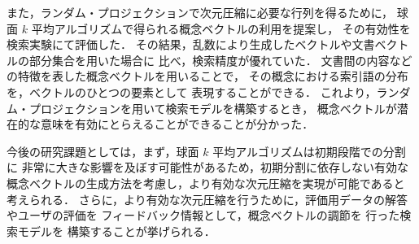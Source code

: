 また，ランダム・プロジェクションで次元圧縮に必要な行列を得るために，
球面 $k$ 平均アルゴリズムで得られる概念ベクトルの利用を提案し，
その有効性を検索実験にて評価した．
その結果，乱数により生成したベクトルや文書ベクトルの部分集合を用いた場合に
比べ，検索精度が優れていた．
文書間の内容などの特徴を表した概念ベクトルを用いることで，
その概念における索引語の分布を，ベクトルのひとつの要素として
表現することができる．
これより，ランダム・プロジェクションを用いて検索モデルを構築するとき，
概念ベクトルが潜在的な意味を有効にとらえることができることが分かった．

今後の研究課題としては，まず，球面 $k$ 平均アルゴリズムは初期段階での分割に
非常に大きな影響を及ぼす可能性があるため，初期分割に依存しない有効な
概念ベクトルの生成方法を考慮し，より有効な次元圧縮を実現が可能であると
考えられる．
さらに，より有効な次元圧縮を行うために，評価用データの解答やユーザの評価を
フィードバック情報として，概念ベクトルの調節を
行った検索モデル\cite{Vogt}\cite{Tai}を
構築することが挙げられる．







\begin{biography}



\end{biography}


